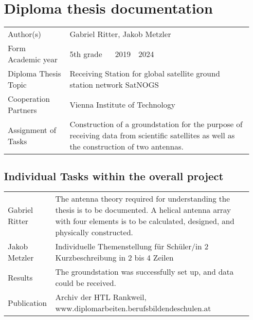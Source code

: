 \section *{Diploma thesis documentation}

\begin{tabular}{@{}p{5cm}p{8cm}}
	Author(s) & Gabriel Ritter, Jakob Metzler\\
	
	Form ~\textbar~ Academic year & 5th grade ~\textbar~ 2019~\textbar~2024 \\
	
	Diploma Thesis Topic & Receiving Station for global satellite ground station network SatNOGS\\
	
	Cooperation Partners & Vienna Institute of Technology \\
	
	Assignment of Tasks & Construction of a groundstation for the purpose of receiving data from scientific satellites as well as the construction of two antennas. \\
\end{tabular}

\pagebreak

\subsection *{Individual Tasks within the overall project}
\begin{tabular}{@{}p{5cm}p{8cm}}
	
	Gabriel Ritter & The antenna theory required for understanding the thesis is to be documented. A helical antenna array with four elements is to be calculated, designed, and physically constructed. \\
	
	Jakob Metzler & 	Individuelle Themenstellung für Schüler/in 2	
	Kurzbeschreibung in 2 bis 4 Zeilen \\
	
	Results & The groundstation was successfully set up, and data could be received. \\
	
	Publication & Archiv der HTL Rankweil, \newline  www.diplomarbeiten.berufsbildendeschulen.at \\
\end{tabular}
